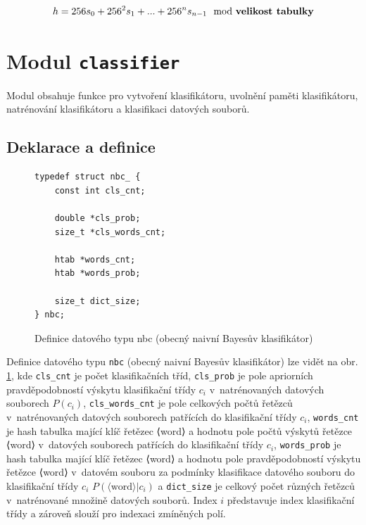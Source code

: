 \documentclass[a4paper, 12pt]{report}
\begin{document}
\begin{equation}
    h = 256 s_0 + 256^2 s_1 + ... + 256^n s_{n-1} \mod \text{\textbf{velikost tabulky}}
    \label{equ:htab-hcode}
\end{equation}

\section{Modul \texttt{classifier}}

Modul obsahuje funkce pro vytvoření klasifikátoru, uvolnění paměti 
klasifikátoru, natrénování klasifikátoru a klasifikaci datových souborů.

\subsection{Deklarace a definice}

\begin{figure}
\caption{Definice datového typu nbc (obecný naivní Bayesův klasifikátor)}
\label{fig:nbc-typedef}
\begin{lstlisting}[frame=tlrb]
typedef struct nbc_ {
    const int cls_cnt;

    double *cls_prob;
    size_t *cls_words_cnt;

    htab *words_cnt;
    htab *words_prob;
    
    size_t dict_size;
} nbc;
\end{lstlisting}
\end{figure}

Definice datového typu \texttt{nbc} (obecný naivní Bayesův klasifikátor)
lze vidět na obr. \ref{fig:nbc-typedef}, kde \texttt{cls\_cnt} je počet
klasifikačních tříd, \texttt{cls\_prob} je 
pole apriorních pravděpodobností výskytu klasifikační třídy $c_i$
v~natrénovaných datových souborech $P(c_i)$, \texttt{cls\_words\_cnt} je 
pole celkových počtů řetězců v~natrénovaných datových souborech patřících 
do klasifikační třídy $c_i$, \texttt{words\_cnt} je hash tabulka mající 
klíč řetězec ⟨word⟩ a hodnotu pole počtů výskytů řetězce ⟨word⟩ v~datových 
souborech patřících do klasifikační třídy $c_i$, \texttt{words\_prob} je 
hash tabulka mající klíč řetězec ⟨word⟩ a hodnotu pole pravděpodobností 
výskytu řetězce ⟨word⟩ v~datovém souboru za podmínky klasifikace datového 
souboru do klasifikační třídy $c_i$ $P(\langle \text{word} \rangle|c_i)$ a 
\texttt{dict\_size} je celkový počet různých řetězců v~natrénované množině 
datových souborů. Index $i$ představuje index klasifikační třídy a zároveň 
slouží pro indexaci zmíněných polí.
\end{document}
